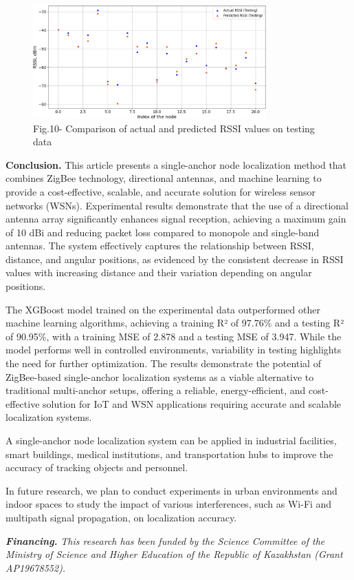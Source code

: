 \begin{figure}[H]
	\centering
	\includegraphics[width=0.8\textwidth]{media/ict/image50}
	\caption*{Fig.10- Comparison of actual and predicted RSSI values on testing data}
\end{figure}

\begin{multicols}{2}
{\bfseries Conclusion.} This article presents a single-anchor node
localization method that combines ZigBee technology, directional
antennas, and machine learning to provide a cost-effective, scalable,
and accurate solution for wireless sensor networks (WSNs). Experimental
results demonstrate that the use of a directional antenna array
significantly enhances signal reception, achieving a maximum gain of 10
dBi and reducing packet loss compared to monopole and single-band
antennas. The system effectively captures the relationship between RSSI,
distance, and angular positions, as evidenced by the consistent decrease
in RSSI values with increasing distance and their variation depending on
angular positions.

The XGBoost model trained on the experimental data outperformed other
machine learning algorithms, achieving a training R² of 97.76\% and a
testing R² of 90.95\%, with a training MSE of 2.878 and a testing MSE of
3.947. While the model performs well in controlled environments,
variability in testing highlights the need for further optimization. The
results demonstrate the potential of ZigBee-based single-anchor
localization systems as a viable alternative to traditional multi-anchor
setups, offering a reliable, energy-efficient, and cost-effective
solution for IoT and WSN applications requiring accurate and scalable
localization systems.

A single-anchor node localization system can be applied in industrial
facilities, smart buildings, medical institutions, and transportation
hubs to improve the accuracy of tracking objects and personnel.

In future research, we plan to conduct experiments in urban environments
and indoor spaces to study the impact of various interferences, such as
Wi-Fi and multipath signal propagation, on localization accuracy.

\emph{{\bfseries Financing.}} \emph{This research has been funded by the
Science Committee of the Ministry of Science and Higher Education of the
Republic of Kazakhstan (Grant AP19678552).}
\end{multicols}

